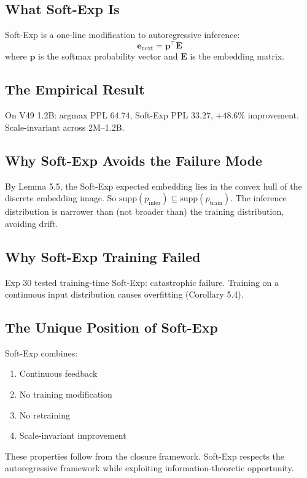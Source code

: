 \documentclass{article}
\begin{document}
\subsection{What Soft-Exp Is}

Soft-Exp is a one-line modification to autoregressive inference:
$$\mathbf{e}_{\text{next}} = \mathbf{p}^\top \mathbf{E}$$
where $\mathbf{p}$ is the softmax probability vector and $\mathbf{E}$ is the embedding matrix.

\subsection{The Empirical Result}

On V49 1.2B: argmax PPL $64.74$, Soft-Exp PPL $33.27$, $+48.6\%$ improvement. Scale-invariant across 2M--1.2B.

\subsection{Why Soft-Exp Avoids the Failure Mode}

By Lemma 5.5, the Soft-Exp expected embedding lies in the convex hull of the discrete embedding image. So $\mathrm{supp}(p_{\text{infer}}) \subseteq \mathrm{supp}(p_{\text{train}})$. The inference distribution is narrower than (not broader than) the training distribution, avoiding drift.

\subsection{Why Soft-Exp Training Failed}

Exp 30 tested training-time Soft-Exp: catastrophic failure. Training on a continuous input distribution causes overfitting (Corollary 5.4).

\subsection{The Unique Position of Soft-Exp}

Soft-Exp combines:
\begin{enumerate}
    \item Continuous feedback
    \item No training modification
    \item No retraining
    \item Scale-invariant improvement
\end{enumerate}

These properties follow from the closure framework. Soft-Exp respects the autoregressive framework while exploiting information-theoretic opportunity.
\end{document}
